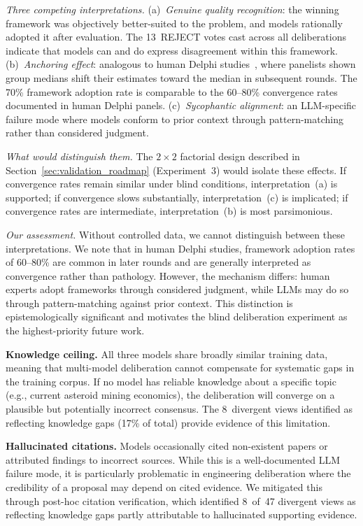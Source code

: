 \documentclass[11pt,a4paper]{article}
\begin{document}
\emph{Three competing interpretations.} (a)~\emph{Genuine quality recognition}: the winning framework was objectively better-suited to the problem, and models rationally adopted it after evaluation. The 13~REJECT votes cast across all deliberations indicate that models can and do express disagreement within this framework. (b)~\emph{Anchoring effect}: analogous to human Delphi studies~\cite{linstone1975delphi}, where panelists shown group medians shift their estimates toward the median in subsequent rounds. The 70\% framework adoption rate is comparable to the 60--80\% convergence rates documented in human Delphi panels. (c)~\emph{Sycophantic alignment}: an LLM-specific failure mode where models conform to prior context through pattern-matching rather than considered judgment.

\emph{What would distinguish them.} The $2\times2$ factorial design described in Section~\ref{sec:validation_roadmap} (Experiment~3) would isolate these effects. If convergence rates remain similar under blind conditions, interpretation~(a) is supported; if convergence slows substantially, interpretation~(c) is implicated; if convergence rates are intermediate, interpretation~(b) is most parsimonious.

\emph{Our assessment.} Without controlled data, we cannot distinguish between these interpretations. We note that in human Delphi studies, framework adoption rates of 60--80\% are common in later rounds and are generally interpreted as convergence rather than pathology. However, the mechanism differs: human experts adopt frameworks through considered judgment, while LLMs may do so through pattern-matching against prior context. This distinction is epistemologically significant and motivates the blind deliberation experiment as the highest-priority future work.

\textbf{Knowledge ceiling.} All three models share broadly similar training data, meaning that multi-model deliberation cannot compensate for systematic gaps in the training corpus. If no model has reliable knowledge about a specific topic (e.g., current asteroid mining economics), the deliberation will converge on a plausible but potentially incorrect consensus. The 8~divergent views identified as reflecting knowledge gaps (17\% of total) provide evidence of this limitation.

\textbf{Hallucinated citations.} Models occasionally cited non-existent papers or attributed findings to incorrect sources. While this is a well-documented LLM failure mode, it is particularly problematic in engineering deliberation where the credibility of a proposal may depend on cited evidence. We mitigated this through post-hoc citation verification, which identified 8~of~47 divergent views as reflecting knowledge gaps partly attributable to hallucinated supporting evidence.
\end{document}

